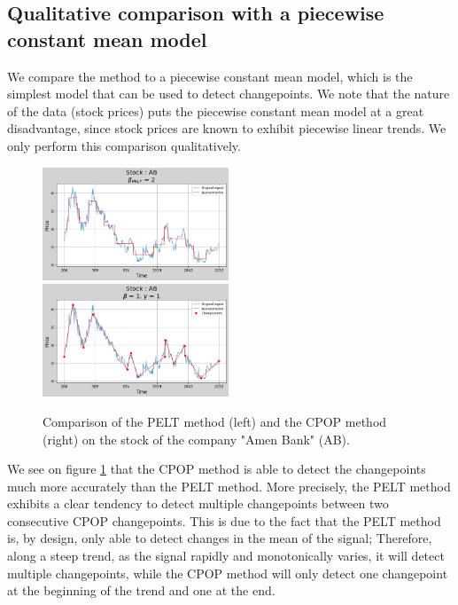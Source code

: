 \documentclass[11pt]{article}
\begin{document}
\subsection{Qualitative comparison with a piecewise constant mean model}
We compare the method to a piecewise constant mean model, which is the simplest model that can be used to detect changepoints. We note that the nature of the data (stock prices) puts the piecewise constant mean model at a great disadvantage, since stock prices are known to exhibit piecewise linear trends. We only perform this comparison qualitatively.
\begin{figure}[h]
    \centering
    \includegraphics[width=0.495\textwidth]{figures/comparaison CPOP PELT/PELT.png}
    \includegraphics[width=0.495\textwidth]{figures/comparaison CPOP PELT/CPOP.png}
    \caption{Comparison of the PELT method (left) and the CPOP method (right) on the stock of the company "Amen Bank" (AB).}
    \label{fig:comparison}
\end{figure}

We see on figure \ref{fig:comparison} that the CPOP method is able to detect the changepoints much more accurately than the PELT method. More precisely, the PELT method exhibits a clear tendency to detect multiple changepoints between two consecutive CPOP changepoints. This is due to the fact that the PELT method is, by design, only able to detect changes in the mean of the signal; Therefore, along a steep trend, as the signal rapidly and monotonically varies, it will detect multiple changepoints, while the CPOP method will only detect one changepoint at the beginning of the trend and one at the end.
\end{document}

